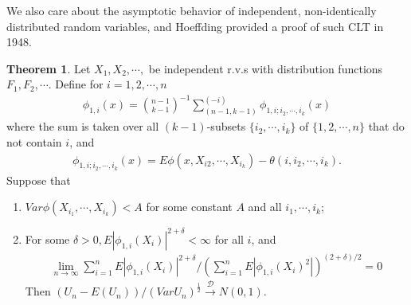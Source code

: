 \documentclass{article}
\theoremstyle{definition}
\newtheorem{theorem}{Theorem}
\numberwithin{Def}{section}
\begin{document}
    We also care about the asymptotic behavior of independent, non-identically distributed random variables, and Hoeffding provided a proof of such CLT in 1948. 
    \begin{theorem}
    Let $X_1, X_2, \cdots,$ be independent r.v.s with distribution functions $F_1, F_2, \cdots$. Define for $i = 1,2, \cdots, n$
    \begin{align}
        \phi_{1,i} (x) = {n-1 \choose k-1}^{-1} \sum_{(n-1, k-1)}^{(-i)} \phi_{1, i; i_2, \cdots, i_k}(x)
    \end{align}
    where the sum is taken over all $(k-1)$-subsets $\{i_2, \cdots, i_k\}$ of $\{1,2, \cdots, n\}$ that do not contain $i$, and 
    \begin{align}
        \phi_{1, i; i_2, \cdots, i_k}(x) = E \phi(x, X_{i2}, \cdots, X_{i_k}) - \theta(i, i_2, \cdots, i_k).
    \end{align}
    Suppose that 
    \begin{enumerate}[label = (\roman*)]
        \item $Var \phi(X_{i_1}, \cdots, X_{i_k} ) < A$ for some constant $A$ and all $i_1, \cdots, i_k$;
        \item For some $\delta > 0, E|\phi_{1, i} (X_i) |^{2 + \delta} < \infty$ for all $i$, and 
        \begin{align}
            \lim_{n \rightarrow \infty} \sum_{i =1}^{n} E|\phi_{1, i} (X_i) |^{2 + \delta} \Big/ (\sum_{i =1}^{n} E|\phi_{1, i} (X_i)^2 |) ^{(2 + \delta)/2} = 0
        \end{align}
       Then $(U_n - E(U_n)) / (Var U_n)^{\frac{1}{2}} \xrightarrow{\mathcal{D}} N(0,1).$ 
    \end{enumerate}
    \end{theorem}
\end{document}
